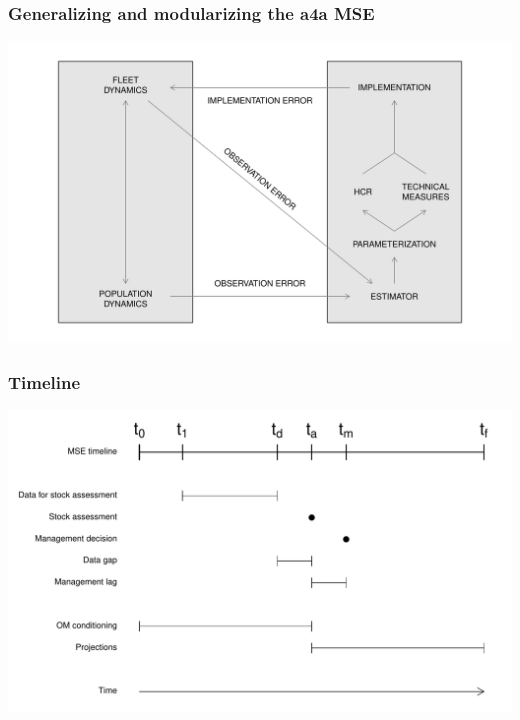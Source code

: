 \documentclass{beamer}
\begin{document}
\begin{frame}
\frametitle{Generalizing and modularizing the a4a MSE}
	
\begin{center}
\includegraphics[height=0.8\textheight]{msea4a2}
\end{center}
	
\end{frame}

\begin{frame}
\frametitle{Timeline}
	
\begin{center}
\includegraphics[height=0.8\textheight]{timeline}
\end{center}
	
\end{frame}
\end{document}
